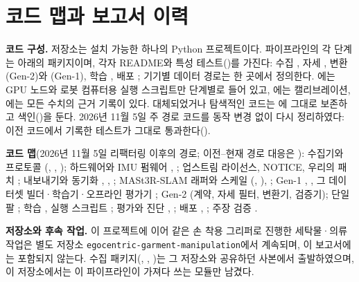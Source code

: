 \documentclass[conference,10pt]{IEEEtran}
\begin{document}
\appendices
\section{코드 맵과 보고서 이력}\label{app:code}
\textbf{코드 구성.} 저장소는 설치 가능한 하나의 Python 프로젝트이다. 파이프라인의 각 단계는  아래의 패키지이며,
각자 README와 특성 테스트()를 가진다: 수집 , 자세 ,
변환 (Gen-2)와 (Gen-1), 학습 , 배포 ;
기기별 데이터 경로는  한 곳에서 정의한다. 에는 GPU 노드와 로봇 컴퓨터용 실행 스크립트만
단계별로 들어 있고, 에는 캘리브레이션, 에는 모든 수치의 근거 기록이 있다. 대체되었거나 탐색적인
코드는 에 그대로 보존하고 색인()을 둔다. 2026년 11월 5일 주 경로 코드를 동작 변경 없이
다시 정리하였다: 이전 코드에서 기록한 테스트가 그대로 통과한다().

\textbf{코드 맵}(2026년 11월 5일 리팩터링 이후의 경로; 이전--현재 경로 대응은 ):
수집기와 프로토콜  (, ,
); 하드웨어와 IMU 펌웨어 , ; 업스트림 라이선스, NOTICE, 우리의 패치
; 내보내기와 동기화 , , ;
MASt3R-SLAM 래퍼와 스케일 (, ),
; Gen-1 , , 그 데이터셋
빌더·학습기·오프라인 평가기 ; Gen-2 (계약, 자세 필터, 변환기, 검증기); 단일 팔
; 학습 , 실행 스크립트 ; 평가와 진단 ,
; 배포 , ; 주장 검증 .

\textbf{저장소와 후속 작업.} 이 프로젝트에 이어 같은 손 착용 그리퍼로 진행한 세탁물·의류 작업은 별도 저장소
\texttt{egocentric-garment-manipulation}에서 계속되며, 이 보고서에는 포함되지 않는다. 수집 패키지(,
, )는 그 저장소와 공유하던 사본에서 출발하였으며, 이 저장소에서는 이 파이프라인이 가져다 쓰는
모듈만 남겼다.
\end{document}
